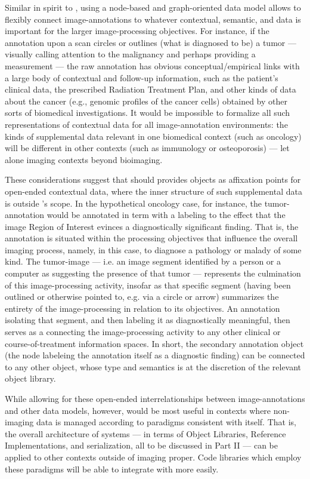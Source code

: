 {\begin{description}
Similar in spirit to \DICOMSR{}, using a node-based and 
graph-oriented data model allows \AXFI{} to 
flexibly connect image-annotations to 
whatever contextual, semantic, and  
data is important for the larger image-processing 
objectives.  For instance, if the annotation upon 
a \CT{} scan circles or outlines (what is 
diagnosed to be) a tumor --- visually 
calling attention to the malignancy and perhaps 
providing a measurement --- the raw annotation 
has obvious conceptual/empirical links with 
a large body of contextual and follow-up 
information, such as the patient's clinical 
data, the prescribed Radiation Treatment Plan, 
and other kinds of data about the cancer 
(e.g., genomic profiles of the cancer cells) 
obtained by other sorts of biomedical investigations.  
It would be impossible to formalize all 
such representations of contextual data for 
all image-annotation environments: the kinds 
of supplemental data relevant in one biomedical 
context (such as oncology) will be 
different in other contexts (such as 
immunology or osteoporosis) --- let alone 
imaging contexts beyond bioimaging.    
 
These considerations suggest that \AXFI{} 
should provides objects as affixation 
points for open-ended contextual 
data, where the inner structure of such 
supplemental data is outside \AXFI{}'s 
scope.  In the hypothetical oncology 
case, for instance, the tumor-annotation 
would be annotated in term with a labeling 
to the effect that the image Region of 
Interest evinces a diagnostically significant 
finding.  That is, the annotation is situated 
within the processing objectives that 
influence the overall imaging process, namely, 
in this case, to diagnose a pathology or 
malady of some kind.  The tumor-image --- 
i.e. an image segment identified by a person 
or a computer as suggesting the presence of that  
tumor --- represents the culmination of this 
image-processing activity, insofar as that 
specific segment (having been outlined or 
otherwise pointed to, e.g. via a circle or 
arrow) summarizes the entirety of the 
image-processing in relation to its 
objectives.  An annotation isolating that 
segment, and then labeling it as 
diagnostically meaningful, then serves as a 
 connecting the image-processing 
activity to any other clinical or course-of-treatment 
information spaces.  In short, the secondary 
annotation object (the node labeleing the 
annotation itself as a diagnostic finding) 
can be connected to any other object, whose 
type and semantics is at the discretion 
of the relevant \AXFI{} object library.

While allowing for these open-ended interrelationships 
between image-annotations and other data models, 
however, \AXFI{} would be most useful in contexts 
where non-imaging data is managed according to paradigms 
consistent with \AXFI{} itself.   That is, the 
overall architecture of \AXFI{} systems --- in terms 
of \AXFI{} Object Libraries, Reference Implementations, 
and  serialization, all to be 
discussed in Part II --- can be applied to 
other contexts outside of imaging proper.  
Code libraries which employ these paradigms 
will be able to integrate with \AXFI{} more easily. 
\end{description}
}







